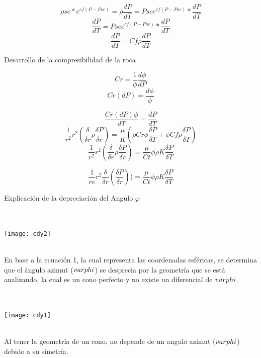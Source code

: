 \documentclass[10pt,a4paper]{report}
\begin{document}
\begin{equation}
\rho{sc} * e^{cf(P-Psc)}=\rho
\dfrac{dP}{dT}=Psc e^{cf(P-Psc)}*\dfrac{dP}{dT}
\end{equation}
\begin{equation}
\dfrac{dP}{dT}=Psc e^{cf(P-Psc)}*\dfrac{dP}{dT}
\end{equation}
\begin{equation}
\dfrac{dP}{dT}=Cf\rho\dfrac{dP}{dT}
\end{equation}

\begin{normalsize}
Desarrollo de la compresibilidad  de la roca
\end{normalsize}
\begin{equation}
Cr=\dfrac{1}{\phi}\dfrac{d\phi}{dP}
\end{equation}
\begin{equation}
Cr(dP)=\dfrac{d\phi}{\phi}
\end{equation}

\begin{equation}
\dfrac{Cr(dP)\phi}{dT}=\dfrac{dP}{dT}
\end{equation}
\begin{equation}
\dfrac{1}{r^{2}} r^{2} (\dfrac{\delta}{\delta{r}}\rho\dfrac{\delta{P}}{\delta{r}})=\dfrac{\mu}{K}(\rho{Cr}\phi\dfrac{\delta{P}}{\delta{T}}+\phi{Cf}\rho\dfrac{\delta{P}}{\delta{T}})
\end{equation}
\begin{equation}
\dfrac{1}{r^{2}} r^{2} (\dfrac{\delta}{\delta{r}}\rho\dfrac{\delta{P}}{\delta{r}})=\dfrac{\mu}{Ct}\phi\rho{K}\dfrac{\delta{P}}{\delta{T}}
\end{equation}

\begin{equation}
\dfrac{1}{re} r^{2} \dfrac{\delta}{\delta{r}}(\dfrac{\delta{P}}{\delta{r}}))=\dfrac{\mu}{Ct}\phi\rho{K}\dfrac{\delta{P}}{\delta{T}}
\end{equation}

\begin{normalsize}
Explicación de la depreciación del Angulo $\varphi$
\end{normalsize}
\\
\\
\texttt{[image: cdy2]}
\\
\\
\begin{normalsize}
En base a la ecuación 1, la cual representa las coordenadas esféricas, se determina que el ángulo azimut ($\\varphi$) se desprecia por la geometría que se está analizando, la cual es un cono perfecto y no existe un diferencial de $\\varphi$. 
\end{normalsize}
\\
\\
\texttt{[image: cdy1]}
\\
\\
\begin{normalsize}
Al tener la geometría de un cono, no depende de un angulo azimut ($\\varphi$) debido a su simetría. 
\end{normalsize}
\end{document}
